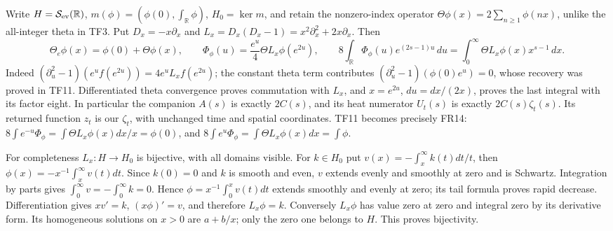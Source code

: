 \documentclass[
  10pt,
  a4paper,
]{article}
\begin{document}
Write \(H=\mathcal S_{\rm ev}(\mathbb R)\),
\(m(\phi)=(\phi(0),\int_{\mathbb R}\phi)\), \(H_0=\ker m\), and retain
the nonzero-index operator \(\Theta\phi(x)=2\sum_{n\ge1}\phi(nx)\),
unlike the all-integer theta in TF3. Put \(D_x=-x\partial_x\) and
\(L_x=D_x(D_x-1)=x^2\partial_x^2+2x\partial_x\). Then \[
\Theta_e\phi(x)=\phi(0)+\Theta\phi(x),\qquad
\Phi_\phi(u)=\frac{e^u}{4}\Theta L_x\phi(e^{2u}),\qquad
8\int_{\mathbb R}\Phi_\phi(u)e^{(2s-1)u}\,du
=\int_0^\infty\Theta L_x\phi(x)x^{s-1}\,dx.
\tag{TF37}
\] Indeed \((\partial_u^2-1)(e^u f(e^{2u}))=4e^u L_x f(e^{2u})\); the
constant theta term contributes \((\partial_u^2-1)(\phi(0)e^u)=0\),
whose recovery was proved in TF11. Differentiated theta convergence
proves commutation with \(L_x\), and \(x=e^{2u}\), \(du=dx/(2x)\),
proves the last integral with its factor eight. In particular the
companion \(A(s)\) is exactly \(2C(s)\), and its heat numerator
\(U_t(s)\) is exactly \(2C(s)\zeta_t(s)\). Its returned function \(z_t\)
is our \(\zeta_t\), with unchanged time and spatial coordinates. TF11
becomes precisely FR14:
\(8\int e^{-u}\Phi_\phi=\int\Theta L_x\phi(x)dx/x=\phi(0)\), and
\(8\int e^u\Phi_\phi=\int\Theta L_x\phi(x)dx=\int\phi\).

For completeness \(L_x:H\to H_0\) is bijective, with all domains
visible. For \(k\in H_0\) put \(v(x)=-\int_x^\infty k(t)dt/t\), then
\(\phi(x)=-x^{-1}\int_x^\infty v(t)dt\). Since \(k(0)=0\) and \(k\) is
smooth and even, \(v\) extends evenly and smoothly at zero and is
Schwartz. Integration by parts gives
\(\int_0^\infty v=-\int_0^\infty k=0\). Hence
\(\phi=x^{-1}\int_0^xv(t)dt\) extends smoothly and evenly at zero; its
tail formula proves rapid decrease. Differentiation gives \(xv'=k\),
\((x\phi)'=v\), and therefore \(L_x\phi=k\). Conversely \(L_x\phi\) has
value zero at zero and integral zero by its derivative form. Its
homogeneous solutions on \(x>0\) are \(a+b/x\); only the zero one
belongs to \(H\). This proves bijectivity.
\end{document}
